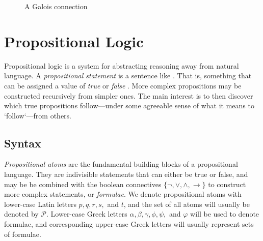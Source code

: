 \begin{figure}[H]
  \caption{A Galois connection}
\end{figure}

\section{Propositional Logic}
\label{section:propositional-logic}

Propositional logic is a system for abstracting reasoning away from natural language. A \textit{propositional
statement} is a sentence like . That is, something that can be
assigned a value of \textit{true} or \textit{false} \cite[p. 7]{Ben1993Mathematical}. More complex propositions
may be constructed recursively from simpler ones. The main interest is to then discover which true
propositions follow---under some agreeable sense of what it means to `follow`---from others.

\subsection{Syntax}
\label{subsection:syntax}  
  
 
 \textit{Propositional atoms} are the fundamental building blocks of
a propositional language. They are indivisible statements that can either be true or false, and may be
be combined with the boolean connectives $\{\neg, \lor, \land, \rightarrow\}$ to construct more complex
statements, or \textit{formulae}. We denote propositional atoms with lower-case Latin letters
$p,q,r,s,$ and $t$, and the set of all atoms will usually be denoted by $\mathcal{P}$. Lower-case
Greek letters $\alpha, \beta, \gamma, \phi, \psi,$ and $\varphi$ will be used to denote formulae, and
corresponding upper-case Greek letters will usually represent sets of formulae.

